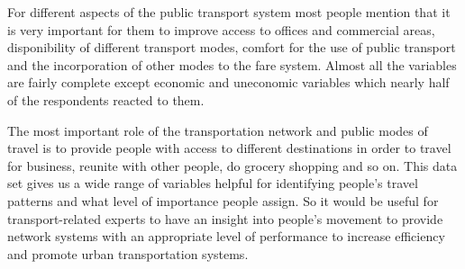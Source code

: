 \documentclass[
11pt, %
oneside, %
english, %
singlespacing, %
]{macthesis} %
\begin{document}
For different aspects of the public transport system most people mention that it is very important for them to improve access to offices and commercial areas, disponibility of different transport modes, comfort for the use of public transport and the incorporation of other modes to the fare system. Almost all the variables are fairly complete except economic and uneconomic variables which nearly half of the respondents reacted to them.

The most important role of the transportation network and public modes of travel is to provide people with access to different destinations in order to travel for business, reunite with other people, do grocery shopping and so on. This data set gives us a wide range of variables helpful for identifying people's travel patterns and what level of importance people assign. So it would be useful for transport-related experts to have an insight into people's movement to provide network systems with an appropriate level of performance to increase efficiency and promote urban transportation systems.
\end{document}
